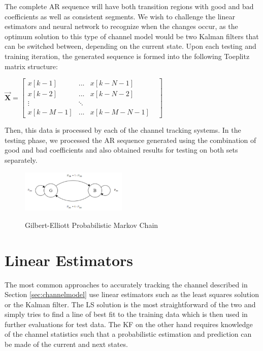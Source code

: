 \documentclass[twocolumn,letterpaper]{IEEEAerospaceCLS}  %
\begin{document}
The complete AR sequence will have both transition regions with good and bad coefficients as well as consistent segments. We wish to challenge the linear estimators and neural network to recognize when the changes occur, as the optimum solution to this type of channel model would be two Kalman filters that can be switched between, depending on the current state. Upon each testing and training iteration, the generated sequence is formed into the following Toeplitz matrix structure:

$\vec{\textbf{X}} = \begin{bmatrix}
x[k-1]   & ...       & x[k-N-1]     & \\
x[k-2]   & ...       & x[k-N-2]     & \\
\vdots             &  \ddots   &              & \\
x[k-M-1] & ...       & x[k-M-N-1]  
\end{bmatrix}$

Then, this data is processed by each of the channel tracking systems. In the testing phase, we processed the AR sequence generated using the combination of good and bad coefficients and also obtained results for testing on both sets separately. 


\begin{figure}[!h]
\centering\includegraphics[width=0.45\textwidth]{figs/GBmodel.PNG}\\
\caption{Gilbert-Elliott Probabilistic Markov Chain}
\label{gbe}
\end{figure}

\section{Linear Estimators}
\label{sec:linest}

The most common approaches to accurately tracking the channel described in Section \ref{sec:channelmodel} use linear estimators such as the least squares solution or the Kalman filter. The LS solution is the most straightforward of the two and simply tries to find a line of best fit to the training data which is then used in further evaluations for test data. The KF on the other hand requires knowledge of the channel statistics such that a probabilistic estimation and prediction can be made of the current and next states. 
\end{document}
